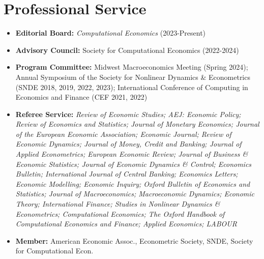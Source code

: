 \documentclass[10pt,letterpaper,en-US]{article}
\begin{document}
\section*{Professional Service}
\begin{itemize}
\item \textbf{Editorial Board:} \emph{Computational Economics} (2023-Present)
\item \textbf{Advisory Council:} Society for Computational Economics (2022-2024)
\item \textbf{Program Committee:} Midwest Macroeconomics Meeting (Spring 2024); Annual Symposium of the Society for Nonlinear Dynamics \& Econometrics (SNDE 2018, 2019, 2022, 2023); International Conference of Computing in Economics and Finance (CEF 2021, 2022)
\item \textbf{Referee Service:} \emph{Review of Economic Studies; AEJ: Economic Policy; Review of Economics and Statistics; Journal of Monetary Economics; Journal of the European Economic Association; Economic Journal; Review of Economic Dynamics; Journal of Money, Credit and Banking; Journal of Applied Econometrics; European Economic Review; Journal of Business \& Economic Statistics; Journal of Economic Dynamics \& Control; Economics Bulletin; International Journal of Central Banking; Economics Letters; Economic Modelling; Economic Inquiry; Oxford Bulletin of Economics and Statistics; Journal of Macroeconomics; Macroeconomic Dynamics; Economic Theory; International Finance; Studies in Nonlinear Dynamics \& Econometrics; Computational Economics; The Oxford Handbook of Computational Economics and Finance; Applied Economics; LABOUR}
\item \textbf{Member:} American Economic Assoc., Econometric Society, SNDE, Society for Computational Econ.
\end{itemize}
\end{document}
